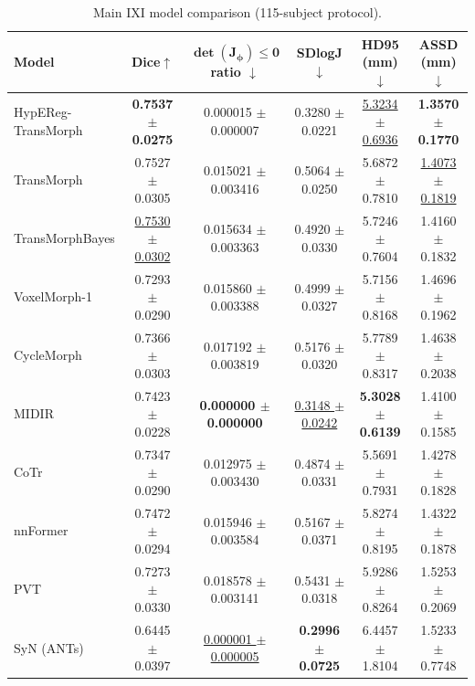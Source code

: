 \documentclass[jimaging,article,submit,pdftex,moreauthors]{Definitions/mdpi}
\begin{document}
\begin{table}[H]
\caption{Main IXI model comparison (115-subject protocol).\label{tab2}}
\centering
\scriptsize
\setlength{\tabcolsep}{3pt}
\begin{tabularx}{\textwidth}{lccccc}
\toprule
\textbf{Model} & \textbf{Dice\(\uparrow\)} & \(\boldsymbol{\det(J_\phi)\le 0}\) \textbf{ratio \(\downarrow\)} & \textbf{SDlogJ\(\downarrow\)} & \textbf{HD95 (mm)\(\downarrow\)} & \textbf{ASSD (mm)\(\downarrow\)}\\
\midrule
HypEReg-TransMorph & \textbf{0.7537 \(\pm\) 0.0275} & 0.000015 \(\pm\) 0.000007 & 0.3280 \(\pm\) 0.0221 & \underline{5.3234 \(\pm\) 0.6936} & \textbf{1.3570 \(\pm\) 0.1770}\\
TransMorph & 0.7527 \(\pm\) 0.0305 & 0.015021 \(\pm\) 0.003416 & 0.5064 \(\pm\) 0.0250 & 5.6872 \(\pm\) 0.7810 & \underline{1.4073 \(\pm\) 0.1819}\\
TransMorphBayes & \underline{0.7530 \(\pm\) 0.0302} & 0.015634 \(\pm\) 0.003363 & 0.4920 \(\pm\) 0.0330 & 5.7246 \(\pm\) 0.7604 & 1.4160 \(\pm\) 0.1832\\
VoxelMorph-1 & 0.7293 \(\pm\) 0.0290 & 0.015860 \(\pm\) 0.003388 & 0.4999 \(\pm\) 0.0327 & 5.7156 \(\pm\) 0.8168 & 1.4696 \(\pm\) 0.1962\\
CycleMorph & 0.7366 \(\pm\) 0.0303 & 0.017192 \(\pm\) 0.003819 & 0.5176 \(\pm\) 0.0320 & 5.7789 \(\pm\) 0.8317 & 1.4638 \(\pm\) 0.2038\\
MIDIR & 0.7423 \(\pm\) 0.0228 & \textbf{0.000000 \(\pm\) 0.000000} & \underline{0.3148 \(\pm\) 0.0242} & \textbf{5.3028 \(\pm\) 0.6139} & 1.4100 \(\pm\) 0.1585\\
CoTr & 0.7347 \(\pm\) 0.0290 & 0.012975 \(\pm\) 0.003430 & 0.4874 \(\pm\) 0.0331 & 5.5691 \(\pm\) 0.7931 & 1.4278 \(\pm\) 0.1828\\
nnFormer & 0.7472 \(\pm\) 0.0294 & 0.015946 \(\pm\) 0.003584 & 0.5167 \(\pm\) 0.0371 & 5.8274 \(\pm\) 0.8195 & 1.4322 \(\pm\) 0.1878\\
PVT & 0.7273 \(\pm\) 0.0330 & 0.018578 \(\pm\) 0.003141 & 0.5431 \(\pm\) 0.0318 & 5.9286 \(\pm\) 0.8264 & 1.5253 \(\pm\) 0.2069\\
SyN (ANTs) & 0.6445 \(\pm\) 0.0397 & \underline{0.000001 \(\pm\) 0.000005} & \textbf{0.2996 \(\pm\) 0.0725} & 6.4457 \(\pm\) 1.8104 & 1.5233 \(\pm\) 0.7748\\
\bottomrule
\end{tabularx}
\end{table}
\end{document}
